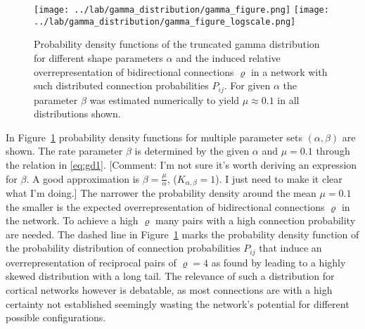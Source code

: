 \begin{figure}[h!]
\centering
\texttt{[image: ../lab/gamma\_distribution/gamma\_figure.png]}
\texttt{[image: ../lab/gamma\_distribution/gamma\_figure\_logscale.png]}
\caption{Probability density functions of the truncated gamma distribution for different shape parameters $\alpha$ and the induced relative overrepresentation of bidirectional connections $\varrho$ in a network with such distributed connection probabilities $P_{ij}$. For given $\alpha$ the parameter $\beta$ was estimated numerically to yield $\mu \approx 0.1$ in all distributions shown.}
\label{fig:gd}
\end{figure}

In Figure~\ref{fig:gd} probability density functions for multiple parameter sets $(\alpha, \beta)$ are shown. The rate parameter $\beta$ is determined by the given $\alpha$ and $\mu = 0.1$ through the relation in \eqref{eq:gd1}. [Comment: I'm not sure it's worth deriving an expression for $\beta$. A good approximation is $\beta = \frac{\mu}{\alpha}$, ($K_{\alpha,\beta} = 1$). I just need to make it clear what I'm doing.]
The narrower the probability density around the mean $\mu = 0.1$ the smaller is the expected overrepresentation of bidirectional connections $\varrho$ in the network. To achieve a high $\varrho$ many pairs with a high connection probability are needed. The dashed line in Figure~\ref{fig:gd} marks the probability density function of the probability distribution of connection probabilities $P_{ij}$ that induce an overrepresentation of reciprocal pairs of $\varrho = 4$ as found by \textcite{Song2005} leading to a highly skewed distribution with a long tail. The relevance of such a distribution for cortical networks however is debatable, as most connections are with a high certainty not established seemingly wasting the network's potential for different possible configurations.






